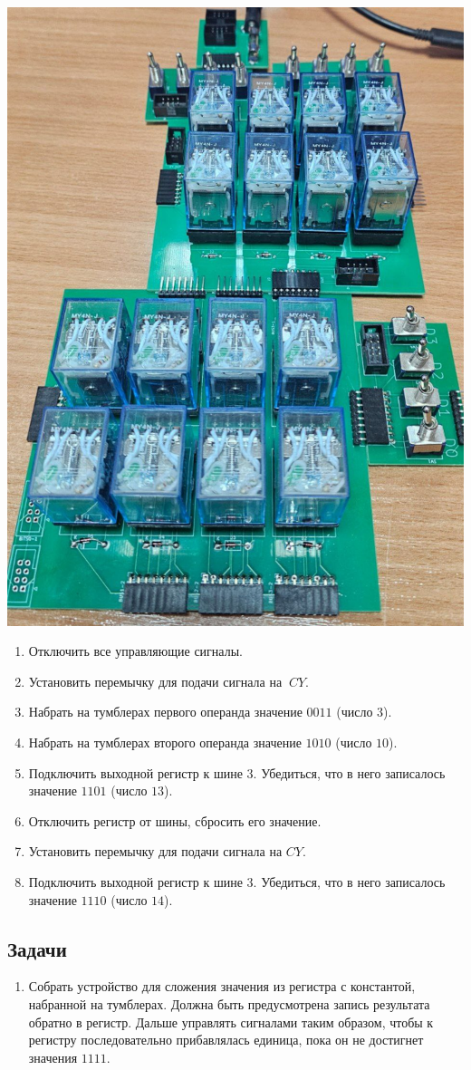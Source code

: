 \includegraphics[width=0.5\columnwidth]{photo/adder.jpg}

\begin{enumerate}
    \item Отключить все управляющие сигналы.
    \item Установить перемычку для подачи сигнала на $~CY$.
    \item Набрать на тумблерах первого операнда значение $0011$ (число $3$).
    \item Набрать на тумблерах второго операнда значение $1010$ (число $10$).
    \item Подключить выходной регистр к шине $3$. Убедиться, что в него записалось значение $1101$ (число $13$).
    \item Отключить регистр от шины, сбросить его значение.
    \item Установить перемычку для подачи сигнала на $CY$.
    \item Подключить выходной регистр к шине $3$. Убедиться, что в него записалось значение $1110$ (число $14$).
\end{enumerate}


\subsection{Задачи}

\begin{enumerate}
    \item Собрать устройство для сложения значения из регистра с константой, набранной на тумблерах.
          Должна быть предусмотрена запись результата обратно в регистр.
          Дальше управлять сигналами таким образом, чтобы к регистру последовательно
          прибавлялась единица, пока он не достигнет значения $1111$.
\end{enumerate}



